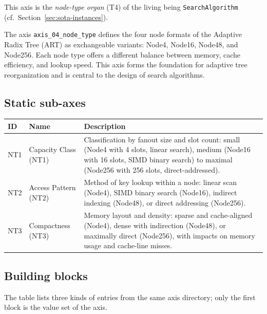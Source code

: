 This axis is the \emph{node-type organ} (T4) of the living being \texttt{SearchAlgorithm} (cf.\ Section~\ref{sec:sota-instances}).

The axis \texttt{axis\_\allowbreak{}04\_\allowbreak{}node\_\allowbreak{}type} defines the four node formats of the Adaptive Radix Tree (ART) as exchangeable variants: Node4, Node16, Node48, and Node256. Each node type offers a different balance between memory, cache efficiency, and lookup speed. This axis forms the foundation for adaptive tree reorganization and is central to the design of search algorithms.

\subsection*{Static sub-axes}

\begin{scriptsize}
\begin{longtable}{@{}>{\raggedright\arraybackslash}p{1.8cm} >{\raggedright\arraybackslash}p{3.2cm} >{\raggedright\arraybackslash}p{8.5cm}@{}}
\toprule
ID & Name & Description \\
\midrule
\endhead%
NT1 & Capacity Class (NT1) & Classification by fanout size and slot count: small (Node4 with 4 slots, linear search), medium (Node16 with 16 slots, SIMD binary search) to maximal (Node256 with 256 slots, direct-addressed). \\
NT2 & Access Pattern (NT2) & Method of key lookup within a node: linear scan (Node4), SIMD binary search (Node16), indirect indexing (Node48), or direct addressing (Node256). \\
NT3 & Compactness (NT3) & Memory layout and density: sparse and cache-aligned (Node4), dense with indirection (Node48), or maximally direct (Node256), with impacts on memory usage and cache-line misses. \\
\bottomrule
\end{longtable}
\end{scriptsize}

\subsection*{Building blocks}

The table lists three kinds of entries from the same axis directory; only the first block is the value set of the axis.

